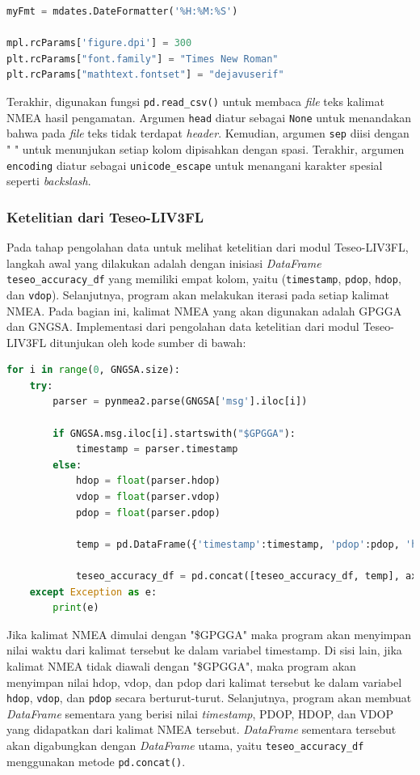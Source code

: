 \begin{lstlisting}[language=python]
myFmt = mdates.DateFormatter('%H:%M:%S') 

mpl.rcParams['figure.dpi'] = 300
plt.rcParams["font.family"] = "Times New Roman"
plt.rcParams["mathtext.fontset"] = "dejavuserif"
\end{lstlisting}

Terakhir, digunakan fungsi \texttt{pd.read\_csv()} untuk membaca \textit{file} teks kalimat NMEA hasil pengamatan. Argumen \texttt{head} diatur sebagai \texttt{None} untuk menandakan bahwa pada \textit{file} teks tidak terdapat \textit{header}. Kemudian, argumen \texttt{sep} diisi dengan " 
" untuk menunjukan setiap kolom dipisahkan dengan spasi. Terakhir, argumen \texttt{encoding} diatur sebagai \texttt{unicode\_escape} untuk menangani karakter spesial seperti \textit{backslash}.

\subsubsection{Ketelitian dari Teseo-LIV3FL}
Pada tahap pengolahan data untuk melihat ketelitian dari modul Teseo-LIV3FL, langkah awal yang dilakukan adalah dengan inisiasi \textit{DataFrame} \texttt{teseo\_accuracy\_df} yang memiliki empat kolom, yaitu (\texttt{timestamp}, \texttt{pdop}, \texttt{hdop}, dan \texttt{vdop}). Selanjutnya, program akan melakukan iterasi pada setiap kalimat NMEA. Pada bagian ini, kalimat NMEA yang akan digunakan adalah GPGGA dan GNGSA. Implementasi dari pengolahan data ketelitian dari modul Teseo-LIV3FL ditunjukan oleh kode sumber di bawah:

\begin{lstlisting}[language=python]
for i in range(0, GNGSA.size):
	try:
		parser = pynmea2.parse(GNGSA['msg'].iloc[i])
		
		if GNGSA.msg.iloc[i].startswith("$GPGGA"):
			timestamp = parser.timestamp
		else:
			hdop = float(parser.hdop)
			vdop = float(parser.vdop)
			pdop = float(parser.pdop)
			
			temp = pd.DataFrame({'timestamp':timestamp, 'pdop':pdop, 'hdop':hdop, 'vdop':vdop}, index=[i])
			
			teseo_accuracy_df = pd.concat([teseo_accuracy_df, temp], axis=0)
	except Exception as e:
		print(e)
\end{lstlisting}

Jika kalimat NMEA dimulai dengan "\$GPGGA" maka program akan menyimpan nilai waktu dari kalimat tersebut ke dalam variabel timestamp. Di sisi lain, jika kalimat NMEA tidak diawali dengan "\$GPGGA", maka program akan menyimpan nilai hdop, vdop, dan pdop dari kalimat tersebut ke dalam variabel \texttt{hdop}, \texttt{vdop}, dan \texttt{pdop} secara berturut-turut. Selanjutnya, program akan membuat \textit{DataFrame} sementara yang berisi nilai \textit{timestamp}, PDOP, HDOP, dan VDOP yang didapatkan dari kalimat NMEA tersebut. \textit{DataFrame} sementara tersebut akan digabungkan dengan \textit{DataFrame} utama, yaitu \texttt{teseo\_accuracy\_df} menggunakan metode \texttt{pd.concat()}.

